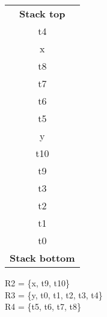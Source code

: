 \documentclass[docid=2021]{comp_exam_round1}
\begin{document}
\noindent
\begin{minipage}{0.20\textwidth}
\begin{center}
    \begin{tabular}{| c |}
        \textbf{Stack top} \\ \cline{1-1}
        t4 \\
        x \\
        t8 \\
        t7 \\
        t6 \\
        t5 \\
        y \\
        t10 \\
        t9 \\
        t3 \\
        t2 \\
        t1 \\
        t0 \\ \cline{1-1}
        \textbf{Stack bottom}
    \end{tabular}
\end{center}
\end{minipage}
\begin{minipage}{0.27\textwidth}
    R2 = \{x, t9, t10\} \\
    R3 = \{y, t0, t1, t2, t3, t4\} \\
    R4 = \{t5, t6, t7, t8\}
\end{minipage}
\end{document}
